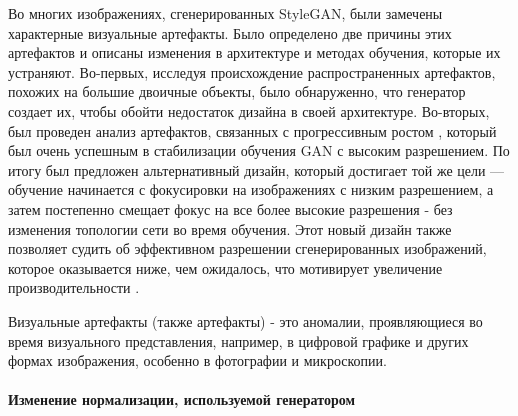 Во многих изображениях, сгенерированных StyleGAN,  были замечены характерные визуальные артефакты. Было определено две причины этих артефактов и описаны изменения в архитектуре и методах обучения, которые их устраняют. Во-первых, исследуя происхождение распространенных артефактов, похожих на большие двоичные объекты, было обнаруженно, что генератор создает их, чтобы обойти недостаток дизайна в своей архитектуре. Во-вторых, был проведен анализ артефактов, связанных с прогрессивным ростом \cite{progressive_growing_of_gans}, который был очень успешным в стабилизации обучения GAN с высоким разрешением. По итогу был предложен альтернативный дизайн, который достигает той же цели — обучение начинается с фокусировки на изображениях с низким разрешением, а затем постепенно смещает фокус на все более высокие разрешения - без изменения топологии сети во время обучения. Этот новый дизайн также позволяет судить об эффективном разрешении сгенерированных изображений, которое оказывается ниже, чем ожидалось, что мотивирует увеличение производительности \cite{StyleGAN2}.

\begin{definition}
    Визуальные артефакты (также артефакты) - это аномалии, проявляющиеся во время визуального представления, например, в цифровой графике и других формах изображения, особенно в фотографии и микроскопии.
\end{definition}

\paragraph{Изменение нормализации, используемой генератором}

